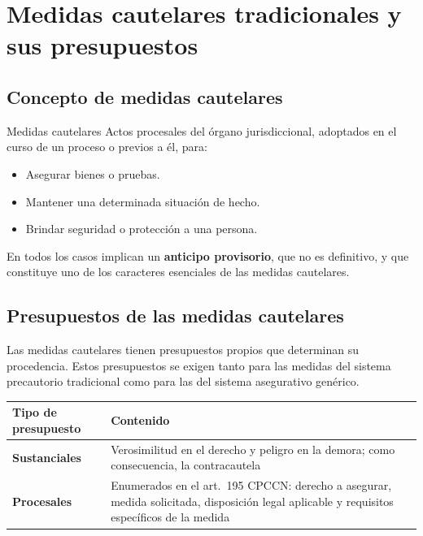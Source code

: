 \documentclass[12pt,oneside]{book}
\begin{document}
\chapter[Medidas cautelares y presupuestos]{Medidas cautelares tradicionales y sus presupuestos}\label{cap:presupuestos}

\section{Concepto de medidas cautelares}

\begin{definition}{Medidas cautelares}
Actos procesales del órgano jurisdiccional, adoptados en el curso de un proceso o previos a él, para:
\begin{itemize}
    \item Asegurar bienes o pruebas.
    \item Mantener una determinada situación de hecho.
    \item Brindar seguridad o protección a una persona.
\end{itemize}
En todos los casos implican un \textbf{anticipo provisorio}, que no es definitivo, y que constituye uno de los caracteres esenciales de las medidas cautelares.
\end{definition}

\section{Presupuestos de las medidas cautelares}

Las medidas cautelares tienen presupuestos propios que determinan su procedencia. Estos presupuestos se exigen tanto para las medidas del sistema precautorio tradicional como para las del sistema asegurativo genérico.

\begin{table}[H]
\centering
\begin{tabularx}{\textwidth}{>{\raggedright\arraybackslash}p{} Y}
\toprule
\textbf{Tipo de presupuesto} & \textbf{Contenido} \\
\midrule
\textbf{Sustanciales} & Verosimilitud en el derecho y peligro en la demora; como consecuencia, la contracautela \\
\textbf{Procesales} & Enumerados en el art.~195 CPCCN: derecho a asegurar, medida solicitada, disposición legal aplicable y requisitos específicos de la medida \\
\bottomrule
\end{tabularx}
\end{table}
\end{document}
